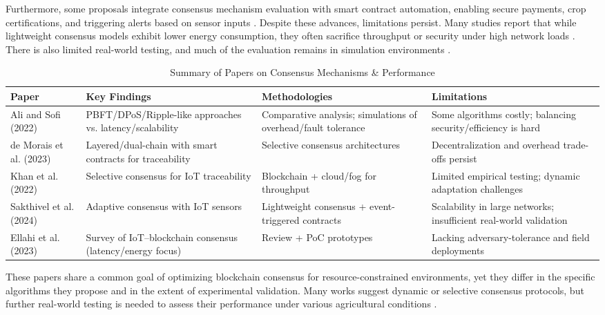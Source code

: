 \documentclass[12pt,onecolumn]{IEEEtran} %
\newcommand{\fitToPage}[1]{\begin{adjustbox}{max width=\textwidth}#1\end{adjustbox}}
\renewcommand{\arraystretch}{1.2} %
\begin{document}
Furthermore, some proposals integrate consensus mechanism evaluation with smart contract automation, enabling secure payments, crop certifications, and triggering alerts based on sensor inputs \cite{saha2022blockchainchangingthe, khan2022ablockchainand}. Despite these advances, limitations persist. Many studies report that while lightweight consensus models exhibit lower energy consumption, they often sacrifice throughput or security under high network loads \cite{saha2022blockchainchangingthe, ali2022blockchainenabledarchitecture}. There is also limited real-world testing, and much of the evaluation remains in simulation environments \cite{khan2022ablockchainand}.

\begin{table}[H]
\caption{Summary of Papers on Consensus Mechanisms \& Performance}
\label{table3}
\centering
\fitToPage{
\begingroup
\setlength{\tabcolsep}{4pt}
\renewcommand{\arraystretch}{1.15}
\footnotesize
\begin{tabularx}{\textwidth}{@{}P{0.18\textwidth}YYY@{}}
\toprule
\textbf{Paper} & \textbf{Key Findings} & \textbf{Methodologies} & \textbf{Limitations} \\
\midrule
Ali and Sofi (2022) & PBFT/DPoS/Ripple-like approaches vs. latency/scalability & Comparative analysis; simulations of overhead/fault tolerance & Some algorithms costly; balancing security/efficiency is hard \\
\addlinespace
de Morais et al. (2023) & Layered/dual-chain with smart contracts for traceability & Selective consensus architectures & Decentralization and overhead trade-offs persist \\
\addlinespace
Khan et al. (2022) & Selective consensus for IoT traceability & Blockchain + cloud/fog for throughput & Limited empirical testing; dynamic adaptation challenges \\
\addlinespace
Sakthivel et al. (2024) & Adaptive consensus with IoT sensors & Lightweight consensus + event-triggered contracts & Scalability in large networks; insufficient real-world validation \\
\addlinespace
Ellahi et al. (2023) & Survey of IoT–blockchain consensus (latency/energy focus) & Review + PoC prototypes & Lacking adversary-tolerance and field deployments \\
\bottomrule
\end{tabularx}
\endgroup
}
\end{table}



These papers share a common goal of optimizing blockchain consensus for resource-constrained environments, yet they differ in the specific algorithms they propose and in the extent of experimental validation. Many works suggest dynamic or selective consensus protocols, but further real-world testing is needed to assess their performance under various agricultural conditions \cite{ali2022blockchainenabledarchitecture, sakthivel2024enhancingtransparencyand}.
\end{document}
